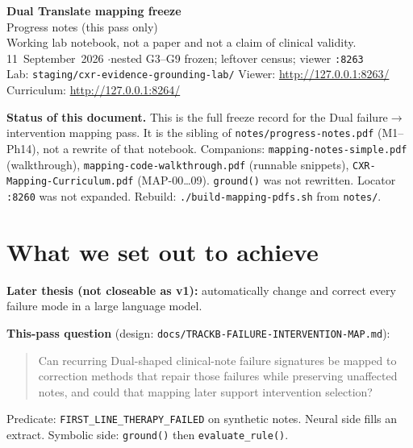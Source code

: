 \documentclass[11pt,a4paper]{article}
\begin{document}
\begin{center}
{\LARGE\bfseries Dual Translate mapping freeze}\\[0.35em]
{\large Progress notes (this pass only)}\\[0.8em]
{\color{muted} Working lab notebook, not a paper and not a claim of clinical validity.}\\[0.6em]
11~September~2026 \quad$\cdot$\quad nested G3--G9 frozen; leftover census; viewer \texttt{:8263}\\[0.3em]
{\small Lab: \texttt{staging/cxr-evidence-grounding-lab/}
\quad Viewer: \url{http://127.0.0.1:8263/}
\quad Curriculum: \url{http://127.0.0.1:8264/}}
\end{center}

\vspace{0.5em}
\begin{tcolorbox}[colback=paper,colframe=black!20,boxrule=0.4pt,arc=1pt,left=8pt,right=8pt,top=6pt,bottom=6pt]
\textbf{Status of this document.}
This is the full freeze record for the Dual failure$\rightarrow$intervention mapping pass.
It is the sibling of \texttt{notes/progress-notes.pdf} (M1--Ph14), not a rewrite of that notebook.
Companions: \texttt{mapping-notes-simple.pdf} (walkthrough),
\texttt{mapping-code-walkthrough.pdf} (runnable snippets),
\texttt{CXR-Mapping-Curriculum.pdf} (MAP-00\ldots09).
\texttt{ground()} was not rewritten. Locator \texttt{:8260} was not expanded.
Rebuild: \texttt{./build-mapping-pdfs.sh} from \texttt{notes/}.
\end{tcolorbox}

\tableofcontents

\section{What we set out to achieve}

\textbf{Later thesis (not closeable as v1):} automatically change and correct every failure mode in a large language model.

\textbf{This-pass question} (design: \texttt{docs/TRACKB-FAILURE-INTERVENTION-MAP.md}):

\begin{quote}
Can recurring Dual-shaped clinical-note failure signatures be mapped to correction methods that repair those failures while preserving unaffected notes, and could that mapping later support intervention selection?
\end{quote}

Predicate: \texttt{FIRST\_LINE\_THERAPY\_FAILED} on synthetic notes. Neural side fills an extract. Symbolic side: \texttt{ground()} then \texttt{evaluate\_rule()}.
\end{document}
